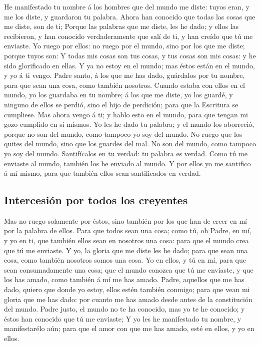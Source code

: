  He manifestado tu nombre á los hombres que del mundo me
diste: tuyos eran, y me los diste, y guardaron tu palabra.
 Ahora han conocido que todas las cosas que me diste, son
de ti;  Porque las palabras que me diste, les he dado; y
ellos las recibieron, y han conocido verdaderamente que salí de ti, y
han creído que tú me enviaste.  Yo ruego por ellos: no
ruego por el mundo, sino por los que me diste; porque tuyos son:
 Y todas mis cosas son tus cosas, y tus cosas son mis
cosas: y he sido glorificado en ellas.  Y ya no estoy en
el mundo; mas éstos están en el mundo, y yo á ti vengo. Padre santo, á
los que me has dado, guárdalos por tu nombre, para que sean una cosa,
como también nosotros.  Cuando estaba con ellos en el
mundo, yo los guardaba en tu nombre; á los que me diste, yo los guardé,
y ninguno de ellos se perdió, sino el hijo de perdición; para que la
Escritura se cumpliese.  Mas ahora vengo á ti; y hablo
esto en el mundo, para que tengan mi gozo cumplido en sí mismos.
 Yo les he dado tu palabra; y el mundo los aborreció,
porque no son del mundo, como tampoco yo soy del mundo. 
No ruego que los quites del mundo, sino que los guardes del mal.
 No son del mundo, como tampoco yo soy del mundo.
 Santifícalos en tu verdad: tu palabra es verdad.
 Como tú me enviaste al mundo, también los he enviado al
mundo.  Y por ellos yo me santifico á mí mismo, para que
también ellos sean santificados en verdad.

\hypertarget{intercesiuxf3n-por-todos-los-creyentes}{%
\subsection{Intercesión por todos los
creyentes}\label{intercesiuxf3n-por-todos-los-creyentes}}

 Mas no ruego solamente por éstos, sino también por los
que han de creer en mí por la palabra de ellos.  Para que
todos sean una cosa; como tú, oh Padre, en mí, y yo en ti, que también
ellos sean en nosotros una cosa: para que el mundo crea que tú me
enviaste.  Y yo, la gloria que me diste les he dado; para
que sean una cosa, como también nosotros somos una cosa. 
Yo en ellos, y tú en mí, para que sean consumadamente una cosa; que el
mundo conozca que tú me enviaste, y que los has amado, como también á mí
me has amado.  Padre, aquellos que me has dado, quiero
que donde yo estoy, ellos estén también conmigo; para que vean mi gloria
que me has dado: por cuanto me has amado desde antes de la constitución
del mundo.  Padre justo, el mundo no te ha conocido, mas
yo te he conocido; y éstos han conocido que tú me enviaste;
 Y yo les he manifestado tu nombre, y manifestarélo aún;
para que el amor con que me has amado, esté en ellos, y yo en ellos.

